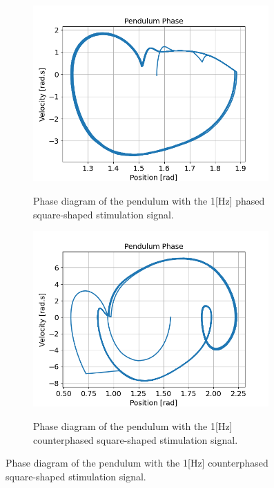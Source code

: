 \documentclass{cmc}
\begin{document}
\begin{figure}[H]
  \begin{subfigure}[b]{0.48\textwidth}
    { \centering
      \includegraphics[width=0.99\textwidth]{figures/2b_square_phased.png} }
    \caption{Phase diagram of the pendulum with the 1[Hz] phased square-shaped stimulation signal.}
    \label{fig:2b_square_signal}
  \end{subfigure}
  \begin{subfigure}[b]{0.48\textwidth}
    { \centering
      \includegraphics[width=0.99\textwidth]{figures/2b_square_counterphased.png} }
    \caption{Phase diagram of the pendulum with the 1[Hz] counterphased square-shaped stimulation signal.}
    \label{fig:2b_square_signal}
  \end{subfigure}
  

\end{figure}
\end{document}
